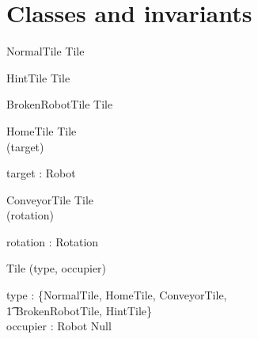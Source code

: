 \documentclass[12pt]{article}
\begin{document}
\section{Classes and invariants}

\begin{class}{NormalTile}
Tile
\end{class}

\begin{class}{HintTile}
Tile
\end{class}

\begin{class}{BrokenRobotTile}
Tile
\end{class}

\begin{class}{HomeTile}
Tile \\
\upharpoonright (target) \\
\begin{state}
target : Robot
\end{state}
\end{class}

\begin{class}{ConveyorTile}
Tile \\
\upharpoonright (rotation) \\
\begin{state}
rotation : Rotation
\end{state}
\end{class}

\begin{class}{Tile}
\upharpoonright (type, occupier) \\
\begin{state}
type : \{NormalTile, HomeTile, ConveyorTile, \\ \t1 BrokenRobotTile, HintTile\} \\
occupier : Robot \cup Null
\end{state}
\end{class}
\end{document}
